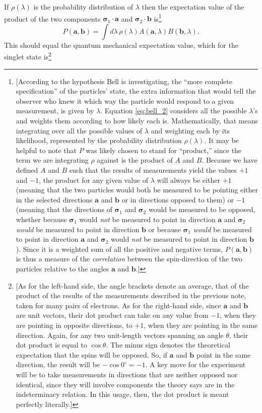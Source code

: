 If $\rho(\lambda)$ is the probability distribution of $\lambda$ then the expectation value of the product of the two 
components $\pmb{\sigma}_1 \cdot \pmb{a}$ and $\pmb{\sigma}_2 \cdot \pmb{b}$ is\footnote{[According to the hypothesis Bell is investigating, the ``more complete specification'' of the particles' state, the extra information that would tell the observer who knew it which way the particle would respond to a given measurement, is given by $\lambda$. Equation \eqref{eq:bell_2} considers all the possible $\lambda$'s and weights them according to how likely each is. Mathematically, that means integrating over all the possible values of $\lambda$ and weighting each by its likelihood, represented by the probability distribution $\rho(\lambda)$. It may be helpful to note that $P$ was likely chosen to stand for ``product,'' since the term we are integrating $\rho$ against is the product of $A$ and $B$. Because we have defined $A$ and $B$ such that the results of measurements yield the values $+1$ and $-1$, the product for any given value of $\lambda$ will always be either $+1$ (meaning that the two particles would both be measured to be pointing either in the selected directions $\pmb{a}$ and $\pmb{b}$ or in directions opposed to them) or $-1$ (meaning that the directions of $\pmb{\sigma}_1$ and $\pmb{\sigma}_2$ would be measured to be opposed, whether because $\pmb{\sigma}_1$ would \emph{not} be measured to point in direction $\pmb{a}$ and $\pmb{\sigma}_2$ \emph{would} be measured to point in direction $\pmb{b}$ or because $\pmb{\sigma}_1$ \emph{would} be measured to point in direction $\pmb{a}$ and $\pmb{\sigma}_2$ would \emph{not} be measured to point in direction $\pmb{b}$). Since it is a weighted sum of all the positive and negative terms, $P(\pmb{a},\pmb{b})$ is thus a measure of the \emph{correlation} between the spin-direction of the two particles relative to the angles $\pmb{a}$ and $\pmb{b}$.]}
\begin{equation}\label{eq:bell_2} %
P(\pmb{a}, \pmb{b}) = \int d\lambda\, \rho(\lambda) A(\pmb{a}, \lambda) B(\pmb{b}, \lambda).
\end{equation}
This should equal the quantum mechanical expectation value, which for the singlet state is\footnote{[As for the left-hand side, the angle brackets denote an average, that of the product of the results of the measurements described in the previous note, taken for many pairs of electrons. As for the right-hand side, since $\pmb{a}$ and $\pmb{b}$ are unit vectors, their dot product can take on any value from $-1$, when they are pointing in opposite directions, to $+1$, when they are pointing in the same direction. Again, for any two unit-length vectors spanning an angle $\theta$, their dot product is equal to $\cos \theta$. The minus sign denotes the theoretical expectation that the spins will be opposed. So, if $\pmb{a}$ and $\pmb{b}$ point in the same direction, the result will be $-\cos 0^{\circ} = -1$. A key move for the experiment will be to take measurements in directions that are neither opposed nor identical, since they will involve components the theory says are in the indeterminacy relation. In this usage, then, the dot product is meant perfectly literally.]}
